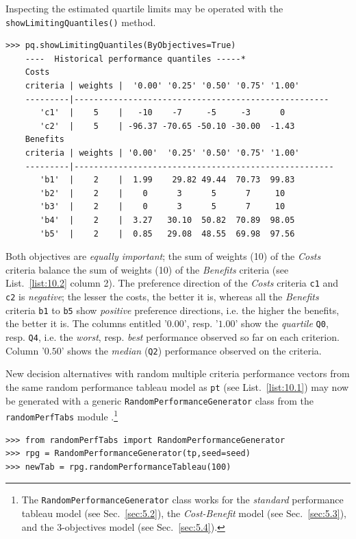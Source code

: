 Inspecting the estimated quartile limits may be operated with the\\ \texttt{showLimitingQuantiles()} method.
\begin{lstlisting}[caption={Printing out the estimated quartile limits},label=list:10.2]
>>> pq.showLimitingQuantiles(ByObjectives=True)
    ----  Historical performance quantiles -----*
    Costs
    criteria | weights |  '0.00' '0.25' '0.50' '0.75' '1.00'   
    ---------|----------------------------------------------------
       'c1'  |    5    |   -10    -7     -5     -3      0  
       'c2'  |    5    | -96.37 -70.65 -50.10 -30.00  -1.43  
    Benefits
    criteria | weights | '0.00'  '0.25' '0.50' '0.75' '1.00'   
    ---------|-----------------------------------------------------
       'b1'  |    2    |  1.99    29.82 49.44  70.73  99.83  
       'b2'  |    2    |    0      3      5      7     10  
       'b3'  |    2    |    0      3      5      7     10  
       'b4'  |    2    |  3.27   30.10  50.82  70.89  98.05  
       'b5'  |    2    |  0.85   29.08  48.55  69.98  97.56  
\end{lstlisting}
Both objectives are \emph{equally important}; the sum of weights (10) of the \emph{Costs} criteria balance the sum of weights (10) of the \emph{Benefits} criteria (see List.~\vref{list:10.2} column 2). The preference direction of the \emph{Costs} criteria \texttt{c1} and \texttt{c2} is \emph{negative}; the lesser the costs, the better it is, whereas all the \emph{Benefits} criteria \texttt{b1} to \texttt{b5} show \emph{positive} preference directions, i.e. the higher the benefits, the better it is. The columns entitled '$0.00$', resp. '$1.00$' show the \emph{quartile} \texttt{Q0}, resp. \texttt{Q4}, i.e. the \emph{worst}, resp. \emph{best} performance observed so far on each criterion. Column '$0.50$' shows the \emph{median} (\texttt{Q2}) performance observed on the criteria.  

New  decision alternatives with random multiple criteria performance vectors from the same random performance tableau model as \texttt{pt} (see List.~\vref{list:10.1}) may now be generated with a generic \texttt{RandomPerformanceGenerator} class from the \texttt{randomPerfTabs} module \citep{BIS-2021b}.\footnote{The \texttt{RandomPerformanceGenerator} class works for the \emph{standard} performance tableau model (see Sec.~\ref{sec:5.2}), the \emph{Cost-Benefit} model (see Sec.~\ref{sec:5.3}), and the 3-objectives model (see Sec.~\ref{sec:5.4}).}
\begin{lstlisting}[caption={Generating 100 new random decision alternatives of the same model},label=list:10.3]
>>> from randomPerfTabs import RandomPerformanceGenerator
>>> rpg = RandomPerformanceGenerator(tp,seed=seed)
>>> newTab = rpg.randomPerformanceTableau(100)
\end{lstlisting}

